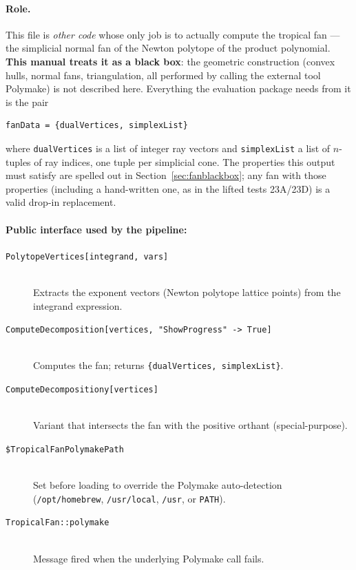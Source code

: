 \documentclass[11pt,a4paper]{article}
\begin{document}
\paragraph{Role.} This file is \emph{other code} whose only job is to actually compute the tropical fan --- the simplicial normal fan of the Newton polytope of the product polynomial. \textbf{This manual treats it as a black box}: the geometric construction (convex hulls, normal fans, triangulation, all performed by calling the external tool Polymake) is not described here. Everything the evaluation package needs from it is the pair
\begin{lstlisting}
fanData = {dualVertices, simplexList}
\end{lstlisting}
where \texttt{dualVertices} is a list of integer ray vectors and \texttt{simplexList} a list of $n$-tuples of ray indices, one tuple per simplicial cone. The properties this output must satisfy are spelled out in Section~\ref{sec:fanblackbox}; any fan with those properties (including a hand-written one, as in the lifted tests 23A/23D) is a valid drop-in replacement.

\paragraph{Public interface used by the pipeline:}

\begin{description}
  \item[\texttt{PolytopeVertices[integrand, vars]}] ~\\
    Extracts the exponent vectors (Newton polytope lattice points) from the integrand expression.

  \item[\texttt{ComputeDecomposition[vertices, "ShowProgress" -> True]}] ~\\
    Computes the fan; returns \texttt{\{dualVertices, simplexList\}}.

  \item[\texttt{ComputeDecompositiony[vertices]}] ~\\
    Variant that intersects the fan with the positive orthant (special-purpose).

  \item[\texttt{\$TropicalFanPolymakePath}] ~\\
    Set before loading to override the Polymake auto-detection (\texttt{/opt/homebrew}, \texttt{/usr/local}, \texttt{/usr}, or \texttt{PATH}).

  \item[\texttt{TropicalFan::polymake}] ~\\
    Message fired when the underlying Polymake call fails.
\end{description}
\end{document}
